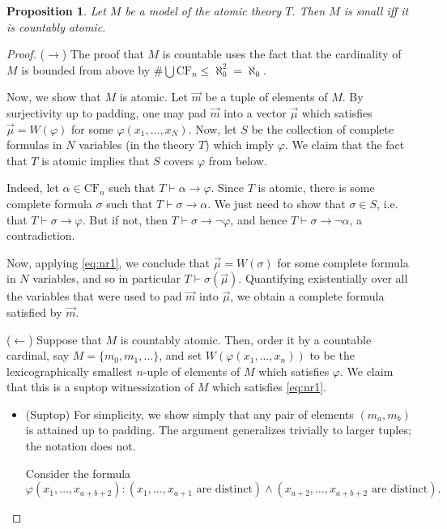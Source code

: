 \documentclass{article}
\newtheorem{prop}[theorem]{Proposition}
\theoremstyle{nonumberplain}
\newtheorem{proof}{Proof}
\newcommand{\CF}{\mathrm{CF}}
\begin{document}
\begin{prop}\label{thm:mainresult0}
Let $M$ be a model of the atomic theory $T$. Then $M$ is small iff it is countably atomic.
\end{prop}

\begin{proof}
($\rightarrow$) The proof that $M$ is countable uses the fact that the cardinality of $M$ is bounded from above by $\# \bigcup \CF_n \leq \aleph_0^2 = \aleph_0$.

Now, we show that $M$ is atomic. Let $\vec m$ be a tuple of elements of $M$. By surjectivity up to padding, one may pad $\vec m$ into a vector $\vec \mu$ which satisfies $\vec \mu = W(\varphi)$ for some $\varphi(x_1, \dots, x_N)$. Now, let $S$ be the collection of complete formulas in $N$ variables (in the theory $T$) which imply $\varphi$. We claim that the fact that $T$ is atomic implies that $S$ covers $\varphi$ from below.

Indeed, let $\alpha \in \CF_n$ such that $T \vdash \alpha \rightarrow \varphi$. Since $T$ is atomic, there is some complete formula $\sigma$ such that $T \vdash \sigma \rightarrow \alpha$. We just need to show that $\sigma \in S$, i.e. that $T \vdash \sigma \rightarrow \varphi$. But if not, then $T \vdash \sigma \rightarrow \neg \varphi$, and hence $T \vdash \sigma \rightarrow \neg \alpha$, a contradiction.

Now, applying \eqref{eq:nr1}, we conclude that $\vec\mu = W(\sigma)$ for some complete formula in $N$ variables, and so in particular $T \vdash \sigma(\vec\mu)$. Quantifying existentially over all the variables that were used to pad $\vec m$ into $\vec \mu$, we obtain a complete formula satisfied by $\vec m$.

\medskip

($\leftarrow$) Suppose that $M$ is countably atomic. Then, order it by a countable cardinal, say $M = \{m_0, m_1, \dots\}$, and set $W(\varphi(x_1, \dots, x_n))$ to be the lexicographically smallest $n$-uple of elements of $M$ which satisfies $\varphi$. We claim that this is a suptop witnessization of $M$ which satisfies \eqref{eq:nr1}.
\begin{itemize}
\item (Suptop) For simplicity, we show simply that any pair of elements $(m_a, m_b)$ is attained up	to padding. The argument generalizes trivially to larger tuples; the notation does not.

Consider the formula
\begin{equation}
\varphi(x_1, \dots, x_{a+b+2}) \colon (\text{$x_1, \dots, x_{a+1}$ are distinct}) \land (\text{$x_{a+2}, \dots, x_{a+b+2}$ are distinct}).
\end{equation}


\end{itemize}
\end{proof}
\end{document}
